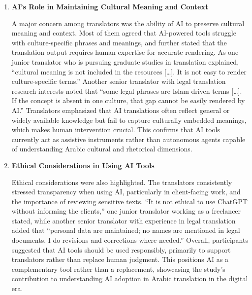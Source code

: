 \documentclass[english]{textolivre}
\begin{document}
\begin{enumerate}
    \item \textbf{AI’s Role in Maintaining Cultural Meaning and Context}

    A major concern among translators was the ability of AI to preserve cultural meaning and context. Most of them agreed that AI-powered tools struggle with culture-specific phrases and meanings, and further stated that the translation output requires human expertise for accurate rendering. As one junior translator who is pursuing graduate studies in translation explained, “cultural meaning is not included in the resources […]. It is not easy to render culture-specific terms.” Another senior translator with legal translation research interests noted that “some legal phrases are Islam-driven terms […]. If the concept is absent in one culture, that gap cannot be easily rendered by AI.” Translators emphasized that AI translations often reflect general or widely available knowledge but fail to capture culturally embedded meanings, which makes human intervention crucial. This confirms that AI tools currently act as assistive instruments rather than autonomous agents capable of understanding Arabic cultural and rhetorical dimensions.

    \item \textbf{Ethical Considerations in Using AI Tools}

    Ethical considerations were also highlighted. The translators consistently stressed transparency when using AI, particularly in client-facing work, and the importance of reviewing sensitive texts. “It is not ethical to use ChatGPT without informing the clients,” one junior translator working as a freelancer stated, while another senior translator with experience in legal translation added that “personal data are maintained; no names are mentioned in legal documents. I do revisions and corrections where needed.” Overall, participants suggested that AI tools should be used responsibly, primarily to support translators rather than replace human judgment. This positions AI as a complementary tool rather than a replacement, showcasing the study’s contribution to understanding AI adoption in Arabic translation in the digital era.


\end{enumerate}
\end{document}
